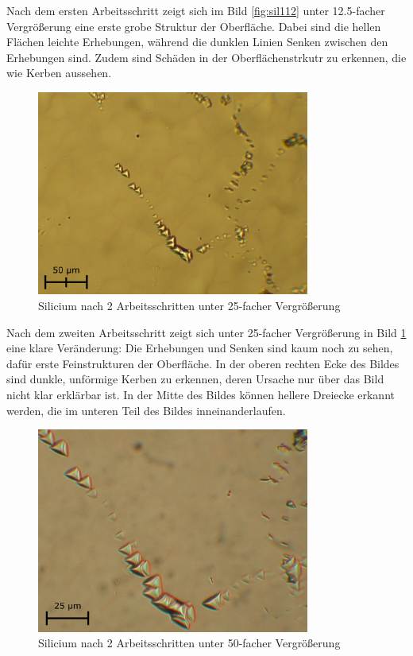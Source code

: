 \documentclass[german, %
parskip=full, %
bibliography=totoc, %
]{scrartcl}
\begin{document}
Nach dem ersten Arbeitsschritt zeigt sich im Bild \ref{fig:sil112} unter 12.5-facher Vergrößerung eine erste grobe Struktur der Oberfläche. Dabei sind die hellen Flächen leichte Erhebungen, während die dunklen Linien Senken zwischen den Erhebungen sind. Zudem sind Schäden in der Oberflächenstrkutr zu erkennen, die wie Kerben aussehen.

\begin{figure}[ht] 
  \centering
     \includegraphics[width=0.8\textwidth]{Silicium_2_25}
  \caption{Silicium nach 2 Arbeitsschritten unter 25-facher Vergrößerung}
  \label{fig:sil225}
\end{figure}

Nach dem zweiten Arbeitsschritt zeigt sich unter 25-facher Vergrößerung in Bild \ref{fig:sil225} eine klare Veränderung: Die Erhebungen und Senken sind kaum noch zu sehen, dafür erste Feinstrukturen der Oberfläche. In der oberen rechten Ecke des Bildes sind dunkle, unförmige Kerben zu erkennen, deren Ursache nur über das Bild nicht klar erklärbar ist. In der Mitte des Bildes können hellere Dreiecke erkannt werden, die im unteren Teil des Bildes inneinanderlaufen. 

\begin{figure}[ht] 
  \centering
     \includegraphics[width=0.8\textwidth]{Silicium_2_50}
  \caption{Silicium nach 2 Arbeitsschritten unter 50-facher Vergrößerung}
  \label{fig:sil250}
\end{figure}
\end{document}

